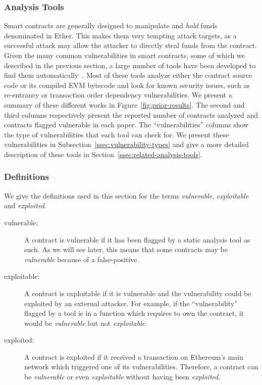 
\subsubsection{Analysis Tools}
\label{ssec:analysis-tools}
Smart contracts are generally designed to manipulate and \emph{hold} funds denominated in Ether. This makes them very tempting attack targets, as a successful attack may allow the attacker to directly steal funds from the contract. Given the many common vulnerabilities in smart contracts, some of which we described in the previous section, a large number of tools have been developed to find them automatically~\cite{Luu2016a,Tsankov2018,mythril}. Most of these tools analyze either the contract source code or its compiled EVM bytecode and look for known security issues, such as re-entrancy or transaction order dependency vulnerabilities. We present a summary of these different works in Figure~\ref{fig:prior-results}. The second and third columns respectively present the reported number of contracts analyzed and contracts flagged vulnerable in each paper. The ``vulnerabilities'' columns show the type of vulnerabilities that each tool can check for. We present these vulnerabilities in Subsection~\ref{ssec:vulnerability-types} and give a more detailed description of these tools in Section~\ref{ssec:related-analysis-tools}.

\subsubsection{Definitions}
\label{ssec:definitions}
We give the definitions used in this section for the terms \emph{vulnerable}, \emph{exploitable} and \emph{exploited}.
\begin{description}
\item[vulnerable:]
  A contract is vulnerable if it has been flagged by a static analysis tool as such.
  As we will see later, this means that some contracts may be \emph{vulnerable} because of a false-positive.
\item[exploitable:]
  A contract is exploitable if it is vulnerable and the vulnerability could be exploited by an external attacker.
  For example, if the ``vulnerability'' flagged by a tool is in a function which requires to own the contract, it would be \emph{vulnerable} but not \emph{exploitable}.
\item[exploited:]
  A contract is exploited if it received a transaction on Ethereum's main network which triggered one of its vulnerabilities.
  Therefore, a contract can be \emph{vulnerable} or even \emph{exploitable} without having been \emph{exploited}.
\end{description}

